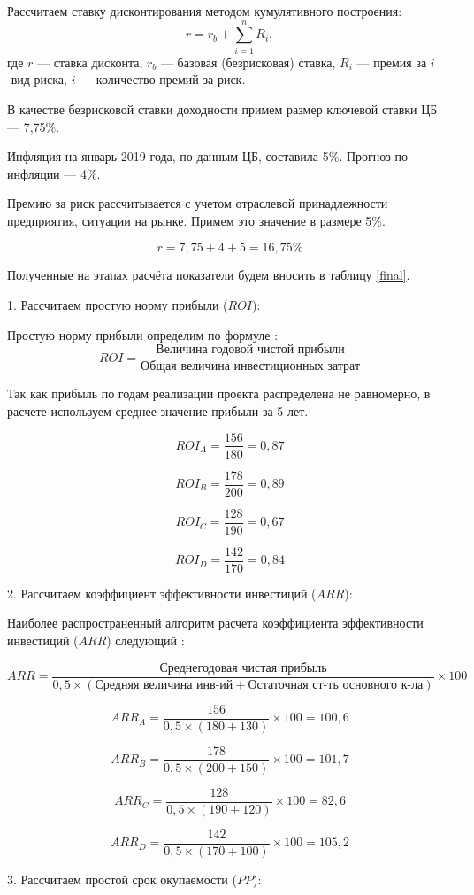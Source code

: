 Рассчитаем ставку дисконтирования методом кумулятивного построения:
\[ r = r_b + \sum\limits_{i=1}^{n} R_i, \]
где  $r$ --- ставка дисконта,
$r_b$ --- базовая (безрисковая) ставка,
$R_i$ --- премия за $i$-вид риска,
$i$ --- количество премий за риск.

В качестве безрисковой ставки доходности примем размер ключевой ставки ЦБ --- 7,75\%. 

Инфляция на январь 2019 года, по данным ЦБ, составила 5\%. Прогноз по инфляции --- 4\%.

Премию за риск рассчитывается с учетом отраслевой принадлежности предприятия, ситуации на рынке. Примем это значение в размере 5\%.

\[ r = 7,75  + 4 + 5 = 16,75 \%\]

Полученные на этапах расчёта показатели будем вносить в таблицу \ref{final}.

1. Рассчитаем простую норму прибыли ($ROI$):

Простую норму прибыли определим по формуле \cite[174]{sergeev}:
\[ ROI = \dfrac{\text{Величина годовой чистой прибыли}}{\text{Общая величина инвестиционных затрат}}\]

Так как прибыль по годам реализации проекта распределена не равномерно, в расчете используем среднее значение прибыли за 5 лет.

\[ ROI_A = \dfrac{156}{180} = 0,87\]

\[ ROI_B = \dfrac{178}{200}=0,89\]

\[ ROI_C = \dfrac{128}{190}=0,67\]

\[ ROI_D =  \dfrac{142}{170}=0,84\]

2. Рассчитаем коэффициент эффективности инвестиций ($ARR$):

Наиболее распространенный алгоритм расчета коэффициента эффективности инвестиций ($ARR$) следующий \cite[214]{leontev}:

\[ ARR = \dfrac{\text{Среднегодовая чистая прибыль}}{0,5 \times (\text{Средняя величина инв-ий} + \text{Остаточная ст-ть основного к-ла})} \times 100 \]

\[ ARR_A =  \dfrac{156}{0,5 \times (180 + 130)} \times 100 =100,6\]

\[ ARR_B =   \dfrac{178}{0,5 \times (200 + 150)} \times 100 =101,7\]

\[ ARR_C =  \dfrac{128}{0,5 \times (190 + 120)} \times 100 =82,6\]

\[ ARR_D =  \dfrac{142}{0,5 \times (170 + 100)} \times 100 =105,2\]

3. Рассчитаем простой срок окупаемости ($PP$):

